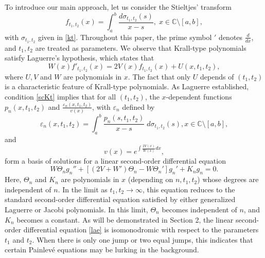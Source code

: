 \documentclass[10pt, reqno]{amsart}
\numberwithin{equation}{section}
\numberwithin{equation}{section}
\begin{document}
To introduce our main approach, let us consider the Stieltjes' transform
\begin{equation}
f_{t_1,t_2}(x)=\int_a^b \frac{d\sigma_{t_1,t_2}(s)}{x-s},\; x\in \mathbb{C}\setminus [a,b], \label{St}
\end{equation}
with $\sigma_{t_1,t_2}$ given in \eqref{kt}. Throughout this paper, the prime symbol $'$ denotes $\frac{d}{dx}$, and $t_1, t_2$ are treated as parameters. We observe that Krall-type polynomials satisfy Laguerre's hypothesis, which states that 
\begin{equation} \label{scKt}
W(x)f'_{t_1,t_2}(x)=2V(x)f_{t_1,t_2}(x)+U(x,t_1,t_2), 
\end{equation}
where $U,V$ and $W$ are polynomials in $x$. The fact that only $U$ depends of $(t_1,t_2)$ is a characteristic feature of Krall-type polynomials. As Laguerre \cite{La} established, condition \eqref{scKt} implies that for all $(t_1,t_2)$, the $x$-dependent functions $p_n(x,t_1,t_2)$ and $\frac{\varepsilon_n(x,t_1,t_2)}{v(x)}$, with $\varepsilon_n$ defined by 
\begin{equation}\label{ep}
\varepsilon_n(x,t_1,t_2)=\int_a^b\frac{p_n(s,t_1,t_2)}{x-s}\;d\sigma_{t_1,t_2}(s), x\in \mathbb{C}\setminus [a,b],
\end{equation}
and
\begin{equation*} \label{v} 
v(x)=e^{\int \frac{2V(x)}{W(x)}dx},
\end{equation*}
form a basis of solutions for a linear second-order differential equation
\begin{equation}
W\Theta_n g_n''+[(2V+W')\Theta_n-W\Theta_n']g_n'+K_n g_n=0.\label{lae}
\end{equation}
Here, $\Theta_n$ and $K_n$ are polynomials in $x$ (depending on $n, t_1,t_2$) whose degrees are independent of $n$. In the limit as $t_1,t_2 \to \infty$, this equation reduces to the standard second-order differential equation satisfied by either generalized Laguerre or Jacobi polynomials. In this limit, $\Theta_n$ becomes independent of $n$, and $K_n$ becomes a constant. As will be demonstrated in Section 2, the linear second-order differential equation \eqref{lae} is isomonodromic with respect to the parameters  $t_1$ and $t_2$. When there is only one jump or two equal jumps, this indicates that certain Painlevé equations may be lurking in the background.
\end{document}
